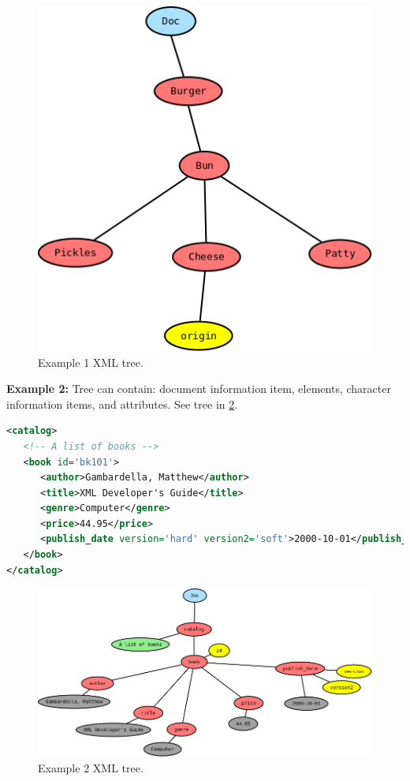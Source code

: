\begin{figure}[h]
	\centering
	\includegraphics[scale=0.3]{images/6-xml_tree1.png}
	\caption{Example 1 XML tree.}
	\label{fig:xml_tree1}
\end{figure}

\textbf{Example 2:} Tree can contain: document information item, elements, character information items, and attributes. See tree in \ref{fig:xml_tree2}.

\begin{lstlisting}[language=XML]
<catalog>
   <!-- A list of books -->
   <book id='bk101'>
      <author>Gambardella, Matthew</author>
      <title>XML Developer's Guide</title>
      <genre>Computer</genre>
      <price>44.95</price>
      <publish_date version='hard' version2='soft'>2000-10-01</publish_date>
   </book>
</catalog>
\end{lstlisting}

\begin{figure}[h]
	\centering
	\includegraphics[scale=0.3]{images/6-xml_tree2}
	\caption{Example 2 XML tree.}
	\label{fig:xml_tree2}
\end{figure}

